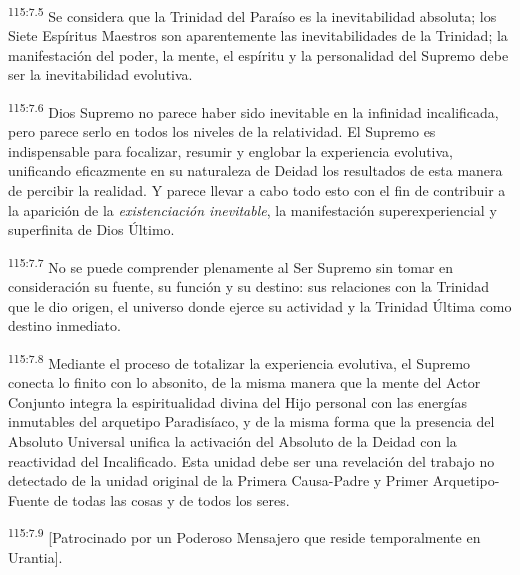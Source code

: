 \par
\textsuperscript{115:7.5} Se considera que la Trinidad del Paraíso es la inevitabilidad absoluta; los Siete Espíritus Maestros son aparentemente las inevitabilidades de la Trinidad; la manifestación del poder, la mente, el espíritu y la personalidad del Supremo debe ser la inevitabilidad evolutiva.

\par
\textsuperscript{115:7.6} Dios Supremo no parece haber sido inevitable en la infinidad incalificada, pero parece serlo en todos los niveles de la relatividad. El Supremo es indispensable para focalizar, resumir y englobar la experiencia evolutiva, unificando eficazmente en su naturaleza de Deidad los resultados de esta manera de percibir la realidad. Y parece llevar a cabo todo esto con el fin de contribuir a la aparición de la \textit{existenciación inevitable}, la manifestación superexperiencial y superfinita de Dios
Último.

\par
\textsuperscript{115:7.7} No se puede comprender plenamente al Ser Supremo sin tomar en consideración su fuente, su función y su destino: sus relaciones con la Trinidad que le dio origen, el universo donde ejerce su actividad y la Trinidad Última como destino inmediato.

\par
\textsuperscript{115:7.8} Mediante el proceso de totalizar la experiencia evolutiva, el Supremo conecta lo finito con lo absonito, de la misma manera que la mente del Actor Conjunto integra la espiritualidad divina del Hijo personal con las energías inmutables del arquetipo Paradisíaco, y de la misma forma que la presencia del Absoluto Universal unifica la activación del Absoluto de la Deidad con la reactividad del Incalificado. Esta unidad debe ser una revelación del trabajo no detectado de la unidad original de la Primera Causa-Padre y Primer Arquetipo-Fuente de todas las cosas y de todos los seres.

\par
\textsuperscript{115:7.9} [Patrocinado por un Poderoso Mensajero que reside temporalmente en Urantia].